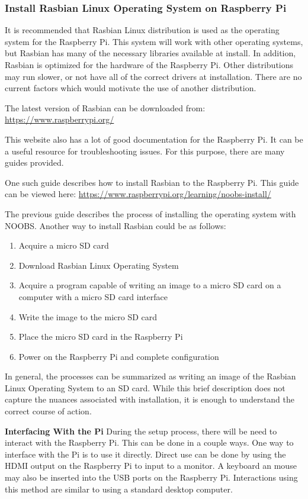 \documentclass{article}	%
\begin{document}
\begin{multicols}{2}
\subsubsection{Install Rasbian Linux Operating System on Raspberry Pi}
It is recommended that Rasbian Linux distribution is used
as the operating system for the Raspberry Pi.
This system will work with other operating systems,
but Rasbian has many of the necessary libraries available
at install.
In addition, Rasbian is optimized for the hardware of the Raspberry Pi.
Other distributions may run slower, or
not have all of the correct drivers at installation.
There are no current factors which would motivate the
use of another distribution.

The latest version of Rasbian can be downloaded from:
\url{https://www.raspberrypi.org/}

This website also has a lot of good documentation for
the Raspberry Pi.
It can be a useful resource for troubleshooting issues.
For this purpose,
there are many guides provided.

One such guide describes how to install Rasbian to the Raspberry Pi.
This guide can be viewed here:
\url{https://www.raspberrypi.org/learning/noobs-install/}

The previous guide describes the process
of installing the operating system with NOOBS.
Another way to install Rasbian could be as follows:
\begin{enumerate}
\item Acquire a micro SD card 
\item Download Rasbian Linux Operating System
\item Acquire a program capable of writing an image
    to a micro SD card on a computer with a micro SD card interface
\item Write the image to the micro SD card
\item Place the micro SD card in the Raspberry Pi
\item Power on the Raspberry Pi and complete configuration
\end{enumerate}

In general,
the processes can be summarized as 
writing an image of the Rasbian Linux Operating System to
an SD card.
While this brief description does not capture the nuances
associated with installation,
it is enough to understand the correct
course of action.

\textbf{Interfacing With the Pi}
During the setup process,
there will be need to interact with the Raspberry Pi.
This can be done in a couple ways.
One way to interface with the Pi is to use
it directly.
Direct use can be done by using the HDMI output
on the Raspberry Pi to input to a monitor.
A keyboard an mouse may also be inserted into
the USB ports on the Raspberry Pi.
Interactions using this method are similar to 
using a standard desktop computer.


\end{multicols}
\end{document}
